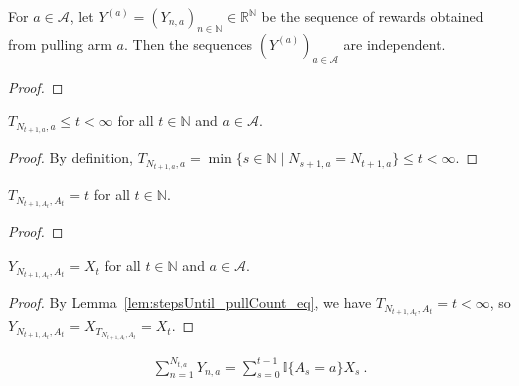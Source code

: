 \begin{lemma}\label{lem:independent_rewardByCount}
For $a \in \mathcal{A}$, let $Y^{(a)} = (Y_{n,a})_{n \in \mathbb{N}} \in \mathbb{R}^{\mathbb{N}}$ be the sequence of rewards obtained from pulling arm $a$. Then the sequences $(Y^{(a)})_{a \in \mathcal{A}}$ are independent.
\end{lemma}

\begin{proof}

\end{proof}


\begin{lemma}\label{lem:stepsUntil_pullCount_le}
  \leanok
$T_{N_{t+1, a}, a} \le t < \infty$ for all $t \in \mathbb{N}$ and $a \in \mathcal{A}$.
\end{lemma}

\begin{proof}\leanok
By definition, $T_{N_{t+1,a}, a} = \min\{s \in \mathbb{N} \mid N_{s+1,a} = N_{t+1,a}\} \le t < \infty$.
\end{proof}


\begin{lemma}\label{lem:stepsUntil_pullCount_eq}
  \leanok
$T_{N_{t+1, A_t}, A_t} = t$ for all $t \in \mathbb{N}$.
\end{lemma}

\begin{proof}\leanok

\end{proof}


\begin{lemma}\label{lem:rewardByCount_pullCount}
  \leanok
$Y_{N_{t+1, A_t}, A_t} = X_t$ for all $t \in \mathbb{N}$ and $a \in \mathcal{A}$.
\end{lemma}

\begin{proof}\leanok
By Lemma~\ref{lem:stepsUntil_pullCount_eq}, we have $T_{N_{t+1,A_t}, A_t} = t < \infty$, so $Y_{N_{t+1,A_t}, A_t} = X_{T_{N_{t+1,A_t}, A_t}} = X_t$.

\end{proof}


\begin{lemma}\label{lem:sum_rewardByCount}
  \leanok
\begin{align*}
  \sum_{n=1}^{N_{t, a}} Y_{n, a} = \sum_{s=0}^{t-1} \mathbb{I}\{A_s = a\} X_s
  \: .
\end{align*}
\end{lemma}

